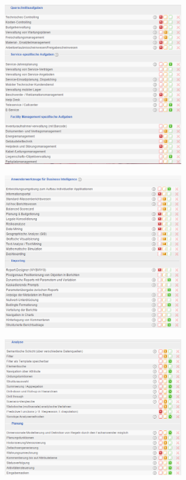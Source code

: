 \documentclass[12pt]{article}
\begin{document}
\begin{figure}[!h]
\centering
\includegraphics[width=0.7\textwidth]{images/tr30}
\end{figure}\FloatBarrier
\noindent
\begin{figure}[!h]
\centering
\includegraphics[width=0.7\textwidth]{images/tr31}
\end{figure}\FloatBarrier
\noindent
\begin{figure}[!h]
\centering
\includegraphics[width=0.7\textwidth]{images/tr32}
\end{figure}\FloatBarrier
\end{document}
